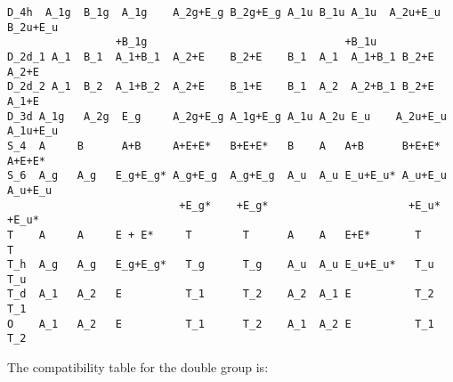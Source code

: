 \documentclass[12pt,a4paper,twoside]{report}
\begin{document}
\begin{tcolorbox}
\begin{scriptsize}
\begin{verbatim}
D_4h  A_1g  B_1g  A_1g    A_2g+E_g B_2g+E_g A_1u B_1u A_1u  A_2u+E_u B_2u+E_u
                 +B_1g                               +B_1u 
D_2d_1 A_1  B_1  A_1+B_1  A_2+E    B_2+E    B_1  A_1  A_1+B_1 B_2+E   A_2+E
D_2d_2 A_1  B_2  A_1+B_2  A_2+E    B_1+E    B_1  A_2  A_2+B_1 B_2+E   A_1+E
D_3d A_1g   A_2g  E_g     A_2g+E_g A_1g+E_g A_1u A_2u E_u    A_2u+E_u A_1u+E_u 
S_4  A     B      A+B     A+E+E*   B+E+E*   B    A   A+B      B+E+E*   A+E+E* 
S_6  A_g   A_g   E_g+E_g* A_g+E_g  A_g+E_g  A_u  A_u E_u+E_u* A_u+E_u A_u+E_u
                           +E_g*    +E_g*                      +E_u*   +E_u*
T    A     A     E + E*     T        T      A    A   E+E*       T        T
T_h  A_g   A_g   E_g+E_g*   T_g      T_g    A_u  A_u E_u+E_u*   T_u      T_u
T_d  A_1   A_2   E          T_1      T_2    A_2  A_1 E          T_2      T_1
O    A_1   A_2   E          T_1      T_2    A_1  A_2 E          T_1      T_2
\end{verbatim}
\end{scriptsize}
\end{tcolorbox}

The compatibility table for the double group is:
\end{document}
